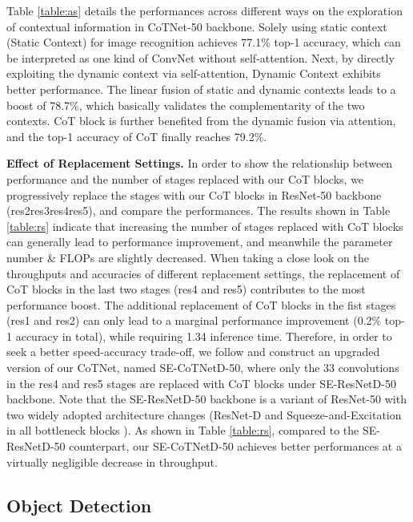 \documentclass[10pt,twocolumn,letterpaper]{article}
\begin{document}
Table \ref{table:as} details the performances across different ways on the exploration of contextual information in CoTNet-50 backbone. Solely using static context (Static Context) for image recognition achieves 77.1\% top-1 accuracy, which can be interpreted as one kind of ConvNet without self-attention. Next, by directly exploiting the dynamic context via self-attention, Dynamic Context exhibits better performance. The linear fusion of static and dynamic contexts leads to a boost of 78.7\%, which basically validates the complementarity of the two contexts. CoT block is further benefited from the dynamic fusion via attention, and the top-1 accuracy of CoT finally reaches 79.2\%.



\textbf{Effect of Replacement Settings.}
In order to show the relationship between performance and the number of stages replaced with our CoT blocks, we progressively replace the stages with our CoT blocks in ResNet-50 backbone (res2res3res4res5), and compare the performances. The results shown in Table \ref{table:rs} indicate that increasing the number of stages replaced with CoT blocks can generally lead to performance improvement, and meanwhile the parameter number \& FLOPs are slightly decreased. When taking a close look on the throughputs and accuracies of different replacement settings, the replacement of CoT blocks in the last two stages (res4 and res5) contributes to the most performance boost. The additional replacement of CoT blocks in the fist stages (res1 and res2) can only lead to a marginal performance improvement (0.2\% top-1 accuracy in total), while requiring 1.34 inference time. Therefore, in order to seek a better speed-accuracy trade-off, we follow \cite{bello2021lambdanetworks} and construct an upgraded version of our CoTNet, named SE-CoTNetD-50, where only the 33 convolutions in the res4 and res5 stages are replaced with CoT blocks under SE-ResNetD-50 backbone. Note that the SE-ResNetD-50 backbone is a variant of ResNet-50 with two widely adopted architecture changes (ResNet-D \cite{he2019bag} and Squeeze-and-Excitation in all bottleneck blocks \cite{hu2018squeeze}). As shown in Table \ref{table:rs}, compared to the SE-ResNetD-50 counterpart, our SE-CoTNetD-50 achieves better performances at a virtually negligible decrease in throughput.



\subsection{Object Detection}
\end{document}
